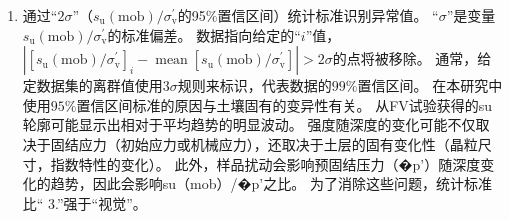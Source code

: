 \begin{ParaColumn}
\begin{enumerate}
        \item 通过“$2\sigma$”（$s_{\mathrm{u}}(\mathrm{mob}) / \sigma_{\mathrm{v}}^{\prime}$的95$\%$置信区间）统计标准识别异常值。  “$\sigma$”是变量$s_{\mathrm{u}}(\mathrm{mob})/\sigma_{\mathrm{v}}^{\prime}$的标准偏差。 数据指向给定的“$i$”值，$\left|\left[s_{\mathrm{u}}(\mathrm{mob}) / \sigma_{\mathrm{v}}^{\prime}\right]_{i}-\operatorname{mean}\left[s_{\mathrm{u}}(\mathrm{mob}) / \sigma_{\mathrm{v}}^{\prime}\right]\right|>2\sigma$的点将被移除。 通常，给定数据集的离群值使用$3\sigma$规则来标识，代表数据的$99\%$置信区间。 在本研究中使用$95\%$置信区间标准的原因与土壤固有的变异性有关。 从FV试验获得的su轮廓可能显示出相对于平均趋势的明显波动。 强度随深度的变化可能不仅取决于固结应力（初始应力或机械应力），还取决于土层的固有变化性（晶粒尺寸，指数特性的变化）。 此外，样品扰动会影响预固结压力（�p'）随深度变化的趋势，因此会影响su（mob）/�p'之比。 为了消除这些问题，统计标准比“ 3.”强于“视觉”。
    \end{enumerate}
    
\end{ParaColumn}